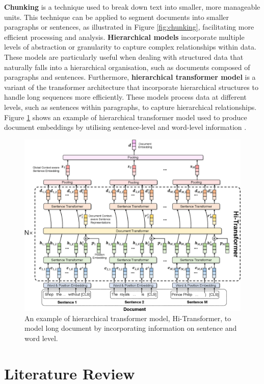 \textbf{Chunking} is a technique used to break down text into smaller, more manageable units. This technique can be applied to segment documents into smaller paragraphs or sentences, as illustrated in Figure \ref{fig:chunking}, facilitating more efficient processing and analysis. \textbf{Hierarchical models} \cite{sun-2020-fine-tune} incorporate multiple levels of abstraction or granularity to capture complex relationships within data. These models are particularly useful when dealing with structured data that naturally falls into a hierarchical organisation, such as documents composed of paragraphs and sentences. Furthermore, \textbf{hierarchical transformer model} is a variant of the transformer architecture that incorporate hierarchical structures to handle long sequences more efficiently. These models process data at different levels, such as sentences within paragraphs, to capture hierarchical relationships. Figure \ref{fig:hi_transformer} shows an example of hierarchical transformer model used to produce document embeddings by utilising sentence-level and word-level information \cite{wu-2021-hi-transformer}.

\begin{figure}[htbp]
    \centering
    \includegraphics[width=0.9\linewidth]{images/hi_transformer.png}
    \caption{An example of hierarchical transformer model, Hi-Transformer\cite{wu-2021-hi-transformer}, to model long document by incorporating information on sentence and word level.}
    \label{fig:hi_transformer}
\end{figure}


\section{Literature Review}

